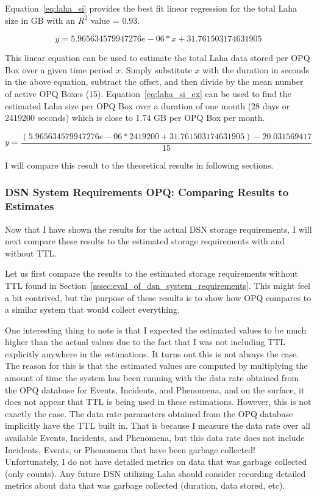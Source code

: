 Equation~\ref{eq:laha_si} provides the best fit linear regression for the total Laha size in GB with an $R^2$ value = 0.93.

\begin{equation}
    y = 5.965634579947276e-06 * x + 31.761503174631905
    \label{eq:laha_si}
\end{equation}

This linear equation can be used to estimate the total Laha data stored per OPQ Box over a given time period $x$. Simply substitute $x$ with the duration in seconds in the above equation, subtract the offset, and then divide by the mean number of active OPQ Boxes (15). Equation~\ref{eq:laha_si_ex} can be used to find the estimated Laha size per OPQ Box over a duration of one month (28 days or 2419200 seconds) which is close to 1.74 GB per OPQ Box per month.

\begin{equation}
    y = \frac{(5.965634579947276e-06 * 2419200 + 31.761503174631905) - 20.031569417}{15}
    \label{eq:laha_si_ex}
\end{equation}

I will compare this result to the theoretical results in following sections.

\subsubsection{DSN System Requirements OPQ: Comparing Results to Estimates}

Now that I have shown the results for the actual DSN storage requirements, I will next compare these results to the estimated storage requirements with and without TTL\@.

Let us first compare the results to the estimated storage requirements without TTL found in Section~\ref{sssec:eval_of_dsn_system_requirements}. This might feel a bit contrived, but the purpose of these results is to show how OPQ compares to a similar system that would collect everything.

One interesting thing to note is that I expected the estimated values to be much higher than the actual values due to the fact that I was not including TTL explicitly anywhere in the estimations. It turns out this is not always the case. The reason for this is that the estimated values are computed by multiplying the amount of time the system has been running with the data rate obtained from the OPQ database for Events, Incidents, and Phenomena, and on the surface, it does not appear that TTL is being used in these estimations. However, this is not exactly the case. The data rate parameters obtained from the OPQ database implicitly have the TTL built in. That is because I measure the data rate over all available Events, Incidents, and Phenomena, but this data rate does not include Incidents, Events, or Phenomena that have been garbage collected! Unfortunately, I do not have detailed metrics on data that was garbage collected (only counts). Any future DSN utilizing Laha should consider recording detailed metrics about data that was garbage collected (duration, data stored, etc).

